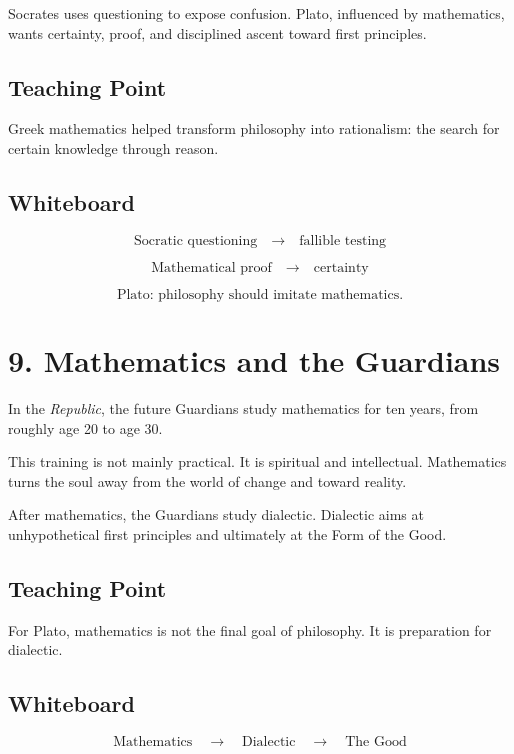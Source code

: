 \documentclass[11pt]{article}
\begin{document}
Socrates uses questioning to expose confusion. Plato, influenced by mathematics, wants
certainty, proof, and disciplined ascent toward first principles.

\subsection*{Teaching Point}

Greek mathematics helped transform philosophy into rationalism: the search for certain
knowledge through reason.

\subsection*{Whiteboard}

\[
\text{Socratic questioning}
\quad \longrightarrow \quad
\text{fallible testing}
\]

\[
\text{Mathematical proof}
\quad \longrightarrow \quad
\text{certainty}
\]

\[
\text{Plato: philosophy should imitate mathematics.}
\]

\section*{9. Mathematics and the Guardians}

In the \emph{Republic}, the future Guardians study mathematics for ten years, from roughly
age 20 to age 30.

This training is not mainly practical. It is spiritual and intellectual. Mathematics turns the
soul away from the world of change and toward reality.

After mathematics, the Guardians study dialectic. Dialectic aims at unhypothetical first
principles and ultimately at the Form of the Good.

\subsection*{Teaching Point}

For Plato, mathematics is not the final goal of philosophy. It is preparation for dialectic.

\subsection*{Whiteboard}

\[
\text{Mathematics}
\quad \longrightarrow \quad
\text{Dialectic}
\quad \longrightarrow \quad
\text{The Good}
\]
\end{document}
